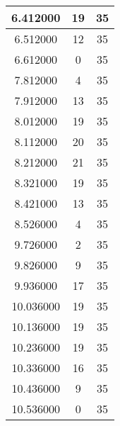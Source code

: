 \begin{longtable}[htbp]{|c|c|c|}
6.412000 & 19 & 35 \\ \hline
6.512000 & 12 & 35 \\ \hline
6.612000 & 0 & 35 \\ \hline
7.812000 & 4 & 35 \\ \hline
7.912000 & 13 & 35 \\ \hline
8.012000 & 19 & 35 \\ \hline
8.112000 & 20 & 35 \\ \hline
8.212000 & 21 & 35 \\ \hline
8.321000 & 19 & 35 \\ \hline
8.421000 & 13 & 35 \\ \hline
8.526000 & 4 & 35 \\ \hline
9.726000 & 2 & 35 \\ \hline
9.826000 & 9 & 35 \\ \hline
9.936000 & 17 & 35 \\ \hline
10.036000 & 19 & 35 \\ \hline
10.136000 & 19 & 35 \\ \hline
10.236000 & 19 & 35 \\ \hline
10.336000 & 16 & 35 \\ \hline
10.436000 & 9 & 35 \\ \hline
10.536000 & 0 & 35 \\ \hline
\end{longtable}
